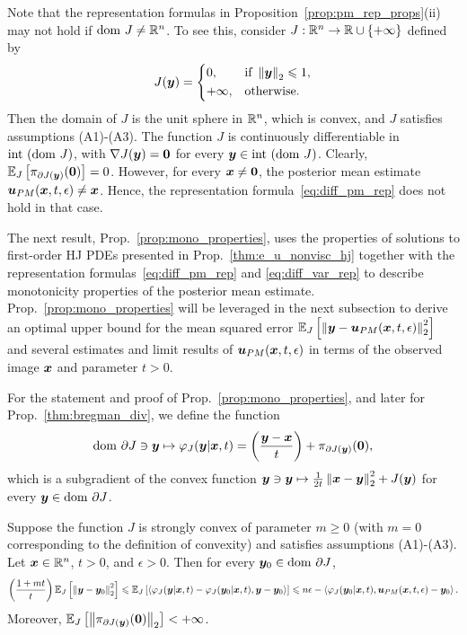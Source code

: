 \begin{rem}
Note that the representation formulas in Proposition~\ref{prop:pm_rep_props}(ii) may not hold if $\mathrm{dom~} J \neq \mathbb{R}^n$. To see this, consider $J:\mathbb{R}^n\to\mathbb{R}\cup\{+\infty\}$ defined by
\begin{equation*}
J(\boldsymbol{y}) =
\begin{dcases}
0, & \textrm{if } \left\Vert \boldsymbol{y} \right\Vert_2 \leqslant 1,\\
+\infty, & \textrm{otherwise}.
\end{dcases}
\end{equation*}
Then the domain of $J$ is the unit sphere in $\mathbb{R}^n$, which is convex, and $J$ satisfies assumptions (A1)-(A3). The function $J$ is continuously differentiable in $\mathrm{int~}(\mathrm{dom~} J)$, with $\nabla J(\boldsymbol{y}) = \boldsymbol{0}$ for every $\boldsymbol{y}\in\mathrm{int~}(\mathrm{dom~} J)$. Clearly, $\mathbb{E}_{J}\left [{\pi_{\partial J(\boldsymbol{y})}(\boldsymbol{0})}\right] = 0$. However, for every $\boldsymbol{x} \neq \boldsymbol{0}$, the posterior mean estimate $\boldsymbol{u}_{PM}(\boldsymbol{x},t,\epsilon) \neq \boldsymbol{x}$. Hence, the representation formula~\eqref{eq:diff_pm_rep} does not hold in that case.
\end{rem}

The next result, Prop.~\ref{prop:mono_properties}, uses the properties of solutions to first-order HJ PDEs presented in Prop.~\ref{thm:e_u_nonvisc_hj} together with the representation formulas~\eqref{eq:diff_pm_rep} and \eqref{eq:diff_var_rep} to describe monotonicity properties of the posterior mean estimate. Prop.~\ref{prop:mono_properties} will be leveraged in the next subsection to derive an optimal upper bound for the mean squared error $\mathbb{E}_{J}\left [{\left\Vert{\boldsymbol{y}-\boldsymbol{u}_{PM}(\boldsymbol{x},t,\epsilon)} \right\Vert_{2}^{2}}\right]$ and several estimates and limit results of $\boldsymbol{u}_{PM}(\boldsymbol{x},t,\epsilon)$ in terms of the observed image $\boldsymbol{x}$ and parameter $t>0$. 

For the statement and proof of Prop.~\ref{prop:mono_properties}, and later for Prop.~\ref{thm:bregman_div}, we define the function
\begin{equation*}
    \mathrm{dom~}\partial J \ni \boldsymbol{y} \mapsto \varphi_J(\boldsymbol{y}|\boldsymbol{x},t) = \left(\frac{\boldsymbol{y}-\boldsymbol{x}}{t}\right) + \pi_{\partial J(\boldsymbol{y})}(\boldsymbol{0}),
\end{equation*}
which is a subgradient of the convex function $\boldsymbol{y} \ni \boldsymbol{y} \mapsto \frac{1}{2t}\left\Vert{\boldsymbol{x}-\boldsymbol{y}} \right\Vert_{2}^{2} + J(\boldsymbol{y})$ for every $\boldsymbol{y} \in \mathrm{dom~}\partial J$.

\begin{prop} \label{prop:mono_properties}
Suppose the function $J$ is strongly convex of parameter $m\geqslant0$ (with $m=0$ corresponding to the definition of convexity) and satisfies assumptions (A1)-(A3). Let $\boldsymbol{x}\in\mathbb{R}^n$, $t>0$, and $\epsilon>0$. Then for every $\boldsymbol{y}_0 \in \mathrm{dom~}\partial J$,
\begin{equation}  \label{eq:monotonicity_prop}
\left(\frac{1+mt}{t}\right)\mathbb{E}_{J}\left [{\left\Vert{\boldsymbol{y}-\boldsymbol{y}_{0}} \right\Vert_{2}^{2}}\right] \leqslant \mathbb{E}_{J}\left [{\left\langle \varphi_J(\boldsymbol{y}|\boldsymbol{x},t)-\varphi_J(\boldsymbol{y}_0|\boldsymbol{x},t),\boldsymbol{y}-\boldsymbol{y}_{0}\right\rangle}\right] \leqslant n\epsilon -\left\langle \varphi_J(\boldsymbol{y}_0|\boldsymbol{x},t), \boldsymbol{u}_{PM}(\boldsymbol{x},t,\epsilon) - \boldsymbol{y}_0 \right\rangle.
\end{equation}
Moreover, $\mathbb{E}_{J}\left [{\left\Vert{\pi_{\partial J(\boldsymbol{y})}(\boldsymbol{0})} \right\Vert_{2}}\right] < +\infty$.
\end{prop}

